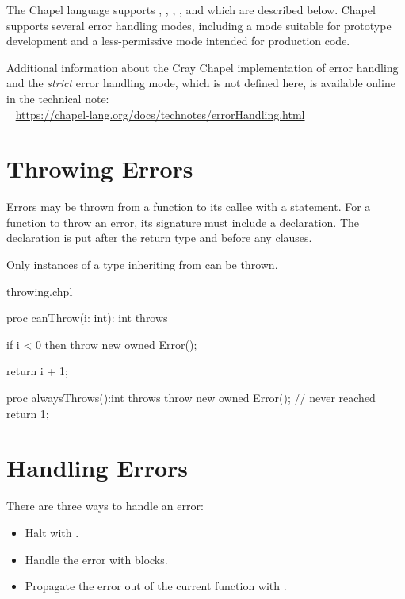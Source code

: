 \label{Error_Handling}

The Chapel language supports , , ,
, and  which are described below. Chapel
supports several error handling modes, including a mode suitable
for prototype development and a less-permissive mode intended
for production code.

\begin{craychapel}
Additional information about the Cray Chapel implementation of
error handling and the \emph{strict} error handling mode, which
is not defined here, is available online in the technical note:
\\ %
\mbox{$$ $$ $$} %
\url{https://chapel-lang.org/docs/technotes/errorHandling.html}
\end{craychapel}


\section{Throwing Errors}
\label{Throwing_Errors}

Errors may be thrown from a function to its callee with a 
statement. For a function to throw an error, its signature must include
a  declaration. The declaration is put after the return
type and before any  clauses.

Only  instances of a type inheriting from  can be
thrown.

\begin{chapelexample}{throwing.chpl}
\begin{chapel}
proc canThrow(i: int): int throws {
  if i < 0 then
    throw new owned Error();

  return i + 1;
}

proc alwaysThrows():int throws {
  throw new owned Error();
  // never reached
  return 1;
}
\end{chapel}
\end{chapelexample}


\section{Handling Errors}
\label{Handling_Errors}

There are three ways to handle an error:

\begin{itemize}
\item Halt with .
\item Handle the error with  blocks.
\item Propagate the error out of the current function with .
\end{itemize}


